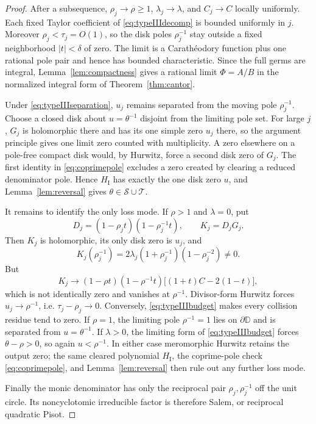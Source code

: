 \documentclass[11pt,reqno]{amsart}
\theoremstyle{definition}
\theoremstyle{remark}
\newcommand{\D}{\mathbb D}
\newcommand{\calS}{\mathcal S}
\newcommand{\calT}{\mathcal T}
\begin{document}
\begin{proof}
After a subsequence, $\rho_j\to\rho\ge1$, $\lambda_j\to\lambda$, and
$C_j\to C$ locally uniformly.  Each fixed Taylor coefficient of
\eqref{eq:typeIIIdecomp} is bounded uniformly in $j$.  Moreover
$\rho_j<\tau_j=O(1)$, so the disk poles $\rho_j^{-1}$ stay outside a fixed
neighborhood $|t|<\delta$ of zero.  The limit is a Carath\'eodory function
plus one rational pole pair and hence has bounded characteristic.  Since the
full germs are integral, Lemma~\ref{lem:compactness} gives a rational limit
$\Phi=A/B$ in the normalized integral form of
Theorem~\ref{thm:cantor}.

Under \eqref{eq:typeIIIseparation}, $u_j$ remains separated from the moving
pole $\rho_j^{-1}$.  Choose a closed disk about $u=\theta^{-1}$ disjoint
from the limiting pole set.  For large $j$, $G_j$ is holomorphic there and
has its one simple zero $u_j$ there, so the argument principle gives one
limit zero counted with multiplicity.  A zero elsewhere on a pole-free
compact disk would, by Hurwitz, force a second disk zero of $G_j$.  The first
identity in \eqref{eq:coprimepole} excludes a zero created by clearing a
reduced denominator pole.  Hence $H_{\mathrm I}$ has exactly the one disk
zero $u$, and Lemma~\ref{lem:reversal} gives
$\theta\in\calS\cup\calT$.

It remains to identify the only loss mode.  If $\rho>1$ and $\lambda=0$, put
\[
 D_j=(1-\rho_jt)(1-\rho_j^{-1}t),\qquad K_j=D_jG_j.
\]
Then $K_j$ is holomorphic, its only disk zero is $u_j$, and
\[
 K_j(\rho_j^{-1})=
 2\lambda_j(1+\rho_j^{-1})(1-\rho_j^{-2})\ne0.
\]
But
\[
 K_j\longrightarrow
 (1-\rho t)(1-\rho^{-1}t)\bigl[(1+t)C-2(1-t)\bigr],
\]
which is not identically zero and vanishes at $\rho^{-1}$.  Divisor-form
Hurwitz forces $u_j\to\rho^{-1}$, i.e. $\tau_j-\rho_j\to0$.
Conversely, \eqref{eq:typeIIIbudget} makes every collision residue tend to
zero.  If $\rho=1$, the limiting pole $\rho^{-1}=1$ lies on $\partial\D$ and
is separated from $u=\theta^{-1}$.  If $\lambda>0$, the limiting form of
\eqref{eq:typeIIIbudget} forces $\theta-\rho>0$, so again
$u<\rho^{-1}$.  In either case meromorphic Hurwitz retains the output zero;
the same cleared polynomial $H_{\mathrm I}$, the coprime-pole check
\eqref{eq:coprimepole}, and Lemma~\ref{lem:reversal} then rule out any
further loss mode.

Finally the monic denominator has only the reciprocal pair
$\rho_j,\rho_j^{-1}$ off the unit circle.  Its noncyclotomic irreducible
factor is therefore Salem, or reciprocal quadratic Pisot.
\end{proof}
\end{document}
